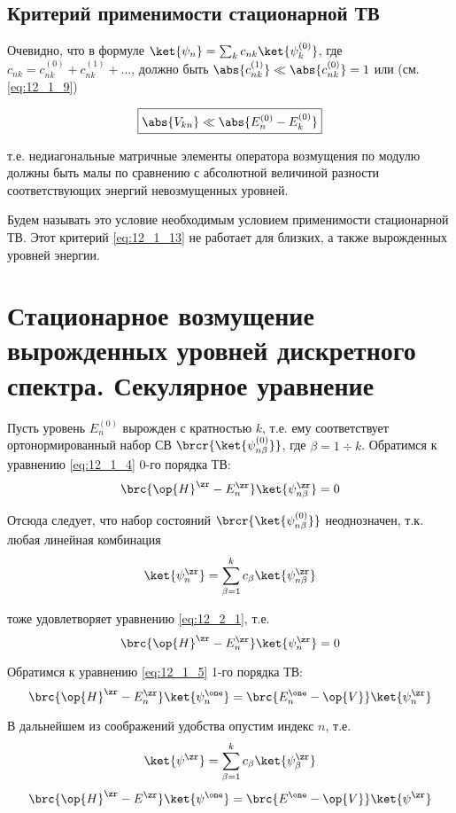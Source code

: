 \subsection{Критерий применимости стационарной ТВ}
 
Очевидно, что в формуле $\ket{\psi_n} = \sum_k c_{nk} \ket{\psi_k^{(0)}}$, где $c_{nk} = c_{nk}^{(0)} + c_{nk}^{(1)} + \dots$, должно быть $\abs{c_{nk}^{(1)}} \ll \abs{c_{nk}^{(0)}} = 1$ или (см. \eqref{eq:12_1_9})

\begin{equation}
\label{eq:12_1_13}
\boxed{\abs{V_{kn}} \ll \abs{E_n^{(0)} - E_k^{(0)}}}
\end{equation}

т.е. недиагональные матричные элементы оператора возмущения по модулю должны быть малы по сравнению с абсолютной величиной разности соответствующих энергий невозмущенных уровней.

Будем называть это условие необходимым условием применимости стационарной ТВ. Этот критерий \eqref{eq:12_1_13} не работает для близких, а также вырожденных уровней энергии.

\section{Стационарное возмущение вырожденных уровней дискретного спектра. Секулярное уравнение}

Пусть уровень $E_n^{(0)}$ вырожден с кратностью $k$, т.е. ему соответствует ортонормированный набор СВ $\brcr{\ket{\psi_{n \beta}^{(0)}}}$, где $\beta = 1 \div k$. Обратимся к уравнению \eqref{eq:12_1_4} 0-го порядка ТВ:
\begin{equation}
\label{eq:12_2_1}
\brc{\op{H}^\zr - E_n^\zr} \ket{\psi_{n \beta}^\zr} = 0
\end{equation}

Отсюда следует, что набор состояний $\brcr{\ket{\psi_{n \beta}^{(0)}}}$ неоднозначен, т.к. любая линейная комбинация
$$
\ket{\psi_n^\zr} = \sum_{\beta = 1}^k c_\beta \ket{\psi_{n \beta}^\zr}
$$

тоже удовлетворяет уравнению \eqref{eq:12_2_1}, т.е.
$$
\brc{\op{H}^\zr - E_n^\zr} \ket{\psi_{n}^\zr} = 0
$$

Обратимся к уравнению \eqref{eq:12_1_5} 1-го порядка ТВ:
$$
\brc{\op{H}^\zr - E_n^\zr} \ket{\psi_{n} ^\one} = \brc{E_n^\one - \op{V}} \ket{\psi_n^\zr}
$$

В дальнейшем из соображений удобства опустим индекс $n$, т.е.
$$
\ket{\psi^\zr} = \sum_{\beta = 1}^k c_\beta \ket{\psi_{\beta}^\zr}
$$
\begin{equation}
\label{eq:12_2_2}
\brc{\op{H}^\zr - E^\zr} \ket{\psi ^\one} = \brc{E^\one - \op{V}} \ket{\psi^\zr}
\end{equation}

